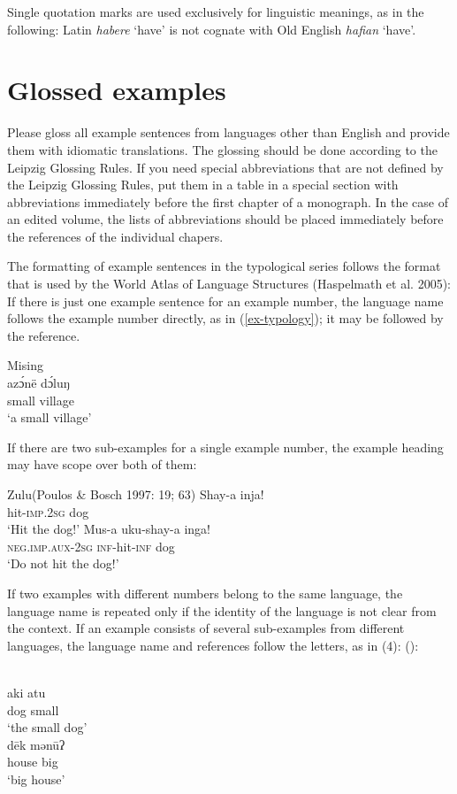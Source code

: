 Single quotation marks are used exclusively for linguistic meanings, as in the following:
\ea
Latin \textit{habere} `have' is not cognate with Old English \textit{hafian} `have'.
\z

\section{Glossed examples}

Please gloss all example sentences from languages other than English and provide them with idiomatic translations. The glossing should be done according
to the Leipzig Glossing Rules. 
If you need special abbreviations that are not defined by the Leipzig Glossing Rules, put them in a table in a special section with abbreviations immediately before the first chapter of a monograph. In the case of an edited volume, the lists of abbreviations should be placed immediately before the references of the individual chapers.

The formatting of example sentences in the typological series follows the format that is used by the World Atlas of Language Structures (Haspelmath et al. 2005): If there is just one example sentence for an example number, the language name follows the example number directly, as in (\ref{ex-typology}); it may be followed by the reference.

{\def\exfont{\normalsize\itshape}
\ea\label{ex-typology}
{\rm Mising \citep[69]{Prasad91a}}\\
\gll azɔ́në dɔ́luŋ\\
     small village\\ 
\glt `a small village' 
\z


If there are two sub-examples for a single example number, the example heading may have scope over both of them:

\ea
{\rm Zulu}{(Poulos \& Bosch 1997: 19; 63)}
\ea
\gll Shay-a		inja!\\
hit-\textsc{imp.2sg}	dog\\
\glt `Hit the dog!'
\ex
\gll	Mus-a	uku-shay-a	inga! \\
	\textsc{neg.imp.aux-2sg}	\textsc{inf}-hit-\textsc{inf}	dog \\
\glt		`Do not hit the dog!'	
\z
\z

If two examples with different numbers belong to the same language, the language name is repeated only if the identity of the language is not clear from the context. If an example consists of several sub-examples from different languages, the language name and references follow the letters, as in (4):
():

\eal
{}\\
\gll aki atu\\ 
     dog small\\ 
\glt ‘the small dog’ 
\\ 
\gll dēk mənūʔ\\
     house big\\
\glt ‘big house’ 
\zl
}

